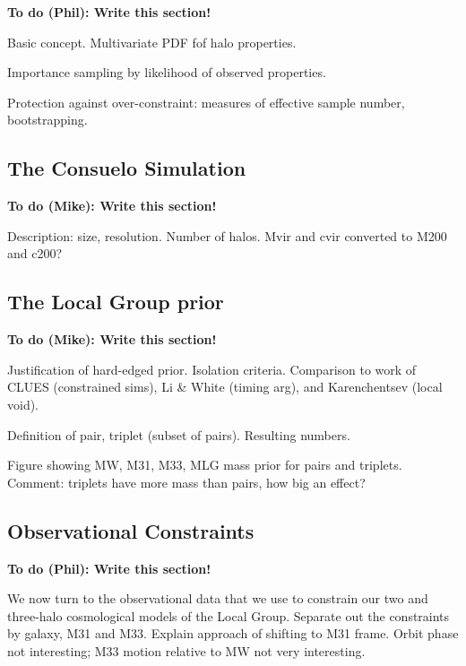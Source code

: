 \documentclass{emulateapj}
\newcommand{\consuelo}{{\sc Consuelo }}
\newcommand{\todo}[2]{{\bf To do (#1): #2}}
\begin{document}
\todo{Phil}{Write this section!}

Basic concept. Multivariate PDF fof halo properties.

Importance sampling by likelihood of observed properties.

Protection against over-constraint: measures of effective sample number,
bootstrapping.


\subsection{The \consuelo Simulation}
\label{sec:sampling}

\todo{Mike}{Write this section!}

Description: size, resolution. Number of halos. Mvir and cvir converted to M200
and c200?



\subsection{The Local Group prior}
\label{sec:sampling}

\todo{Mike}{Write this section!}

Justification of hard-edged prior. Isolation criteria. Comparison to work of
CLUES (constrained sims), Li \& White (timing arg), and Karenchentsev (local
void). 

Definition of pair, triplet (subset of pairs). Resulting numbers. 

Figure showing MW, M31, M33, MLG mass prior for pairs and triplets. Comment:
triplets have more mass than pairs, how big an effect?


\subsection{Observational Constraints}
\label{sec:data}

\todo{Phil}{Write this section!}

We now turn to the observational data that we use to constrain our two and
three-halo cosmological models of the Local Group. Separate out
the constraints by galaxy, M31 and M33.  Explain approach of shifting to M31
frame. Orbit phase not interesting; M33 motion relative to MW not very
interesting.
\end{document}

